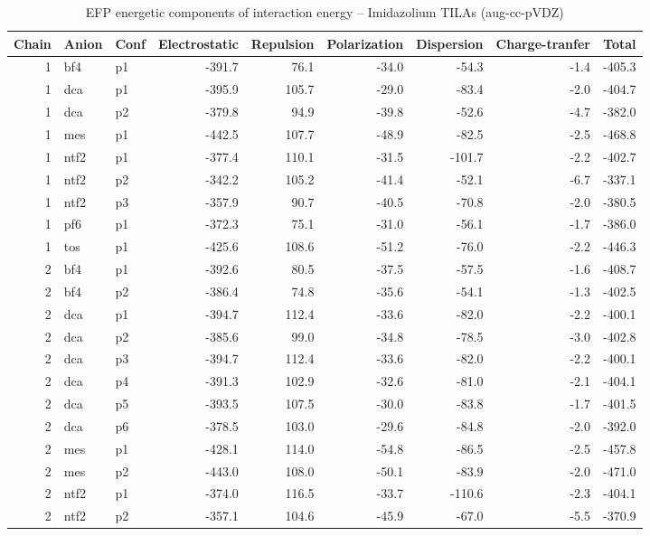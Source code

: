 \documentclass[a4paper]{article}
\begin{document}
\begin{table}[ht]
\centering
\footnotesize
\caption{EFP energetic components of interaction energy -- Imidazolium TILAs (aug-cc-pVDZ)}
\begin{tabular}{rllrrrrrr}
  \hline
Chain & Anion & Conf & Electrostatic & Repulsion & Polarization & Dispersion & Charge-tranfer & Total \\ 
  \hline
 1 & bf4 & p1 & -391.7 & 76.1 & -34.0 & -54.3 & -1.4 & -405.3 \\ 
   1 & dca & p1 & -395.9 & 105.7 & -29.0 & -83.4 & -2.0 & -404.7 \\ 
   1 & dca & p2 & -379.8 & 94.9 & -39.8 & -52.6 & -4.7 & -382.0 \\ 
   1 & mes & p1 & -442.5 & 107.7 & -48.9 & -82.5 & -2.5 & -468.8 \\ 
   1 & ntf2 & p1 & -377.4 & 110.1 & -31.5 & -101.7 & -2.2 & -402.7 \\ 
   1 & ntf2 & p2 & -342.2 & 105.2 & -41.4 & -52.1 & -6.7 & -337.1 \\ 
   1 & ntf2 & p3 & -357.9 & 90.7 & -40.5 & -70.8 & -2.0 & -380.5 \\ 
   1 & pf6 & p1 & -372.3 & 75.1 & -31.0 & -56.1 & -1.7 & -386.0 \\ 
   1 & tos & p1 & -425.6 & 108.6 & -51.2 & -76.0 & -2.2 & -446.3 \\ 
   2 & bf4 & p1 & -392.6 & 80.5 & -37.5 & -57.5 & -1.6 & -408.7 \\ 
   2 & bf4 & p2 & -386.4 & 74.8 & -35.6 & -54.1 & -1.3 & -402.5 \\ 
   2 & dca & p1 & -394.7 & 112.4 & -33.6 & -82.0 & -2.2 & -400.1 \\ 
   2 & dca & p2 & -385.6 & 99.0 & -34.8 & -78.5 & -3.0 & -402.8 \\ 
   2 & dca & p3 & -394.7 & 112.4 & -33.6 & -82.0 & -2.2 & -400.1 \\ 
   2 & dca & p4 & -391.3 & 102.9 & -32.6 & -81.0 & -2.1 & -404.1 \\ 
   2 & dca & p5 & -393.5 & 107.5 & -30.0 & -83.8 & -1.7 & -401.5 \\ 
   2 & dca & p6 & -378.5 & 103.0 & -29.6 & -84.8 & -2.0 & -392.0 \\ 
   2 & mes & p1 & -428.1 & 114.0 & -54.8 & -86.5 & -2.5 & -457.8 \\ 
   2 & mes & p2 & -443.0 & 108.0 & -50.1 & -83.9 & -2.0 & -471.0 \\ 
   2 & ntf2 & p1 & -374.0 & 116.5 & -33.7 & -110.6 & -2.3 & -404.1 \\ 
   2 & ntf2 & p2 & -357.1 & 104.6 & -45.9 & -67.0 & -5.5 & -370.9 \\ 

\end{tabular}
\end{table}
\end{document}
